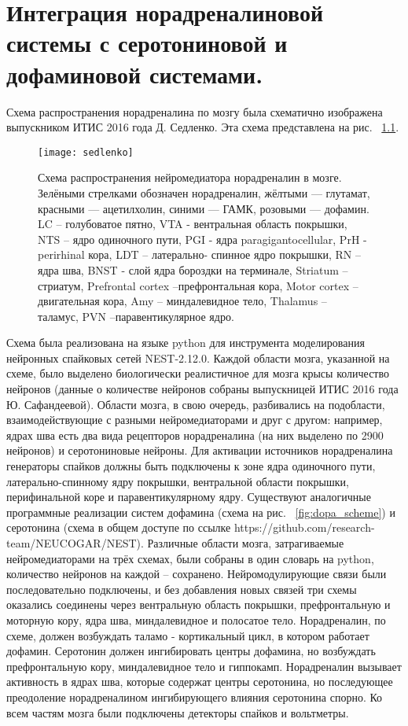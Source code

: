 \chapter{Интеграция норадреналиновой системы с серотониновой и дофаминовой системами.}
\label{chap:implementation}
Схема распространения норадреналина по мозгу была схематично изображена выпускником ИТИС 2016 года Д. Седленко. Эта схема представлена на рис. ~\ref{fig:nora_scheme}.


\begin{figure}
	\centering
	\texttt{[image: sedlenko]}
	\caption{Схема распространения нейромедиатора норадреналин в мозге. Зелёными стрелками обозначен норадреналин, жёлтыми — глутамат, красными — ацетилхолин, синими — ГАМК, розовыми — дофамин. LC – голубоватое пятно, VTA - вентральная область покрышки, NTS – ядро одиночного пути, PGI - ядра paragigantocellular, PrH - perirhinal кора, LDT – латерально- спинное ядро покрышки, RN – ядра шва, BNST - слой ядра бороздки на терминале, Striatum – стриатум, Prefrontal cortex –префронтальная кора, Motor cortex –двигательная кора, Amy – миндалевидное тело, Thalamus – таламус, PVN –паравентикулярное ядро.}
	\label{fig:nora_scheme}
\end{figure}

Схема была реализована на языке python для инструмента моделирования нейронных спайковых сетей NEST-2.12.0. Каждой области мозга, указанной на схеме, было выделено биологически реалистичное для мозга крысы количество нейронов (данные о количестве нейронов собраны выпускницей ИТИС 2016 года Ю. Сафандеевой). Области мозга, в свою очередь, разбивались на подобласти, взаимодействующие с разными нейромедиаторами и друг с другом: например, ядрах шва есть два вида рецепторов норадреналина (на них выделено по 2900 нейронов) и серотониновые нейроны. Для активации источников норадреналина генераторы спайков должны быть подключены к зоне ядра одиночного пути, латерально-спинному ядру покрышки, вентральной области покрышки, перифинальной коре и паравентикулярному ядру.
Существуют аналогичные программные реализации систем дофамина (схема на рис. ~\ref{fig:dopa_scheme}) и серотонина (схема в общем доступе по ссылке https://github.com/research-team/NEUCOGAR/NEST). Различные области мозга, затрагиваемые нейромедиаторами на трёх схемах, были собраны в один словарь на python, количество нейронов на каждой – сохранено. Нейромодулирующие связи были последовательно подключены, и без добавления новых связей три схемы оказались соединены через вентральную область покрышки, префронтальную и моторную кору, ядра шва, миндалевидное и полосатое тело. Норадреналин, по схеме, должен возбуждать таламо - кортикальный цикл, в котором работает дофамин. Серотонин должен ингибировать центры дофамина, но возбуждать префронтальную кору, миндалевидное тело и гиппокамп. Норадреналин вызывает активность в ядрах шва, которые содержат центры серотонина, но последующее преодоление норадреналином ингибирующего влияния серотонина спорно. Ко всем частям мозга были подключены детекторы спайков и вольтметры.


